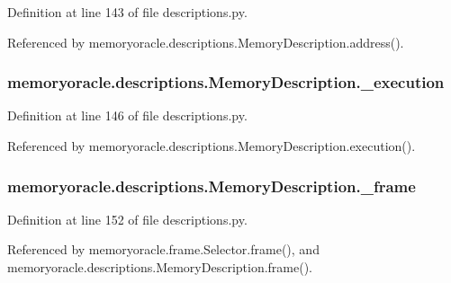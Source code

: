Definition at line 143 of file descriptions.\+py.



Referenced by memoryoracle.\+descriptions.\+Memory\+Description.\+address().

\hypertarget{classmemoryoracle_1_1descriptions_1_1MemoryDescription_ae48342721625d8c170df2c5dd2d73ec3}{}
\subsubsection[{\+\_\+execution}]{\setlength{\rightskip}{0pt plus 5cm}memoryoracle.\+descriptions.\+Memory\+Description.\+\_\+execution\hspace{0.3cm}{\ttfamily [private]}}\label{classmemoryoracle_1_1descriptions_1_1MemoryDescription_ae48342721625d8c170df2c5dd2d73ec3}


Definition at line 146 of file descriptions.\+py.



Referenced by memoryoracle.\+descriptions.\+Memory\+Description.\+execution().

\hypertarget{classmemoryoracle_1_1descriptions_1_1MemoryDescription_a59379998949382c2cda446d79fe1065b}{}
\subsubsection[{\+\_\+frame}]{\setlength{\rightskip}{0pt plus 5cm}memoryoracle.\+descriptions.\+Memory\+Description.\+\_\+frame\hspace{0.3cm}{\ttfamily [private]}}\label{classmemoryoracle_1_1descriptions_1_1MemoryDescription_a59379998949382c2cda446d79fe1065b}


Definition at line 152 of file descriptions.\+py.



Referenced by memoryoracle.\+frame.\+Selector.\+frame(), and memoryoracle.\+descriptions.\+Memory\+Description.\+frame().

